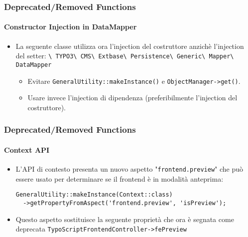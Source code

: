 \begin{frame}[fragile]
	\frametitle{Deprecated/Removed Functions}
	\framesubtitle{Constructor Injection in DataMapper}

	\begin{itemize}

		\item La seguente classe utilizza ora l'injection del costruttore anzichè l'injection del setter:
			\smaller
				\texttt{\textbackslash
					TYPO3\textbackslash
					CMS\textbackslash
					Extbase\textbackslash
					Persistence\textbackslash
					Generic\textbackslash
					Mapper\textbackslash
					DataMapper}
			\normalsize

			\begin{itemize}\smaller
				\item[\ding{228}] Evitare \texttt{GeneralUtility::makeInstance()} e \texttt{ObjectManager->get()}.
				\item[\ding{228}] Usare invece l'injection di dipendenza (preferibilmente l'injection del costruttore).
			\end{itemize}\normalsize

	\end{itemize}

\end{frame}


\begin{frame}[fragile]
	\frametitle{Deprecated/Removed Functions}
	\framesubtitle{Context API}

	\lstset{basicstyle=\tiny\ttfamily}

	\begin{itemize}

		\item L'API di contesto presenta un nuovo aspetto "\texttt{frontend.preview}"
			che può essere usato per determinare se il frontend è in modalità anteprima:

\begin{lstlisting}
GeneralUtility::makeInstance(Context::class)
  ->getPropertyFromAspect('frontend.preview', 'isPreview');
\end{lstlisting}

		\item Questo aspetto sostituisce la seguente proprietà che ora è segnata come deprecata
			\small\texttt{TypoScriptFrontendController->fePreview}\normalsize

	\end{itemize}

\end{frame}

